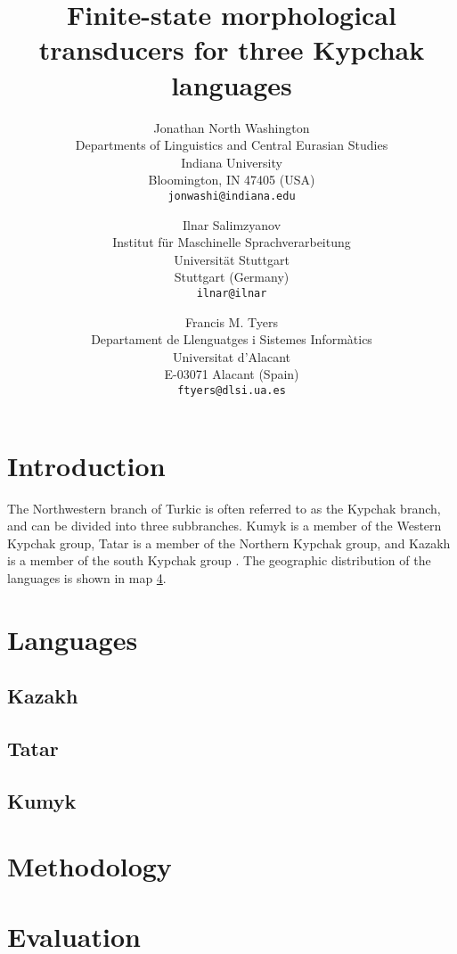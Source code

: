 \documentclass[a4paper,11pt,twocolumn]{article}
\title{Finite-state morphological transducers for three Kypchak languages}
\author{Jonathan North Washington \\
Departments of Linguistics and Central Eurasian Studies\\
Indiana University\\
Bloomington, IN 47405 (USA)\\
\texttt{jonwashi@indiana.edu} \and
Ilnar Salimzyanov  \\
Institut für Maschinelle Sprachverarbeitung \\
Universität Stuttgart\\
Stuttgart (Germany) \\
\texttt{ilnar@ilnar} \and 
Francis M. Tyers\\
Departament de Llenguatges i Sistemes Informàtics \\  
Universitat d'Alacant\\
E-03071 Alacant (Spain)\\
\texttt{ftyers@dlsi.ua.es} 
}
\begin{document}
\maketitleabstract{}

\section{Introduction}

The Northwestern branch of Turkic is often referred to as the Kypchak branch, and can be divided into three subbranches.  Kumyk is a member of the Western Kypchak group, Tatar is a member of the Northern Kypchak group, and Kazakh is a member of the south Kypchak group \citep[82-83]{histofturkic}.  The geographic distribution of the languages is shown in map \ref{}.

\cite{washington2012}
\cite{salimzyanov2013}
\cite{bekmanova2013}

\section{Languages}

\subsection{Kazakh}

\subsection{Tatar}

\subsection{Kumyk}

\cite{bammatov1960}

\section{Methodology}

\section{Evaluation}
\end{document}

